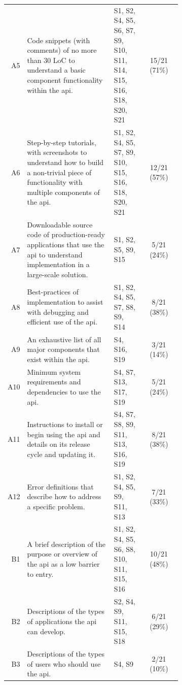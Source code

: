 \begin{small}
\begin{longtable}{rp{0.5\linewidth}|p{0.175\linewidth}|c}
  {A5}&
  {Code snippets (with comments) of no more than 30 LoC to understand a basic component functionality within the \gls{api}.}
  &
  {S1, S2, S4, S5, S6, S7, S9, S10, S11, S14, S15, S16, S18, S20, S21} &
  {15/21 (71\%)}\\

  {A6}&
  {Step-by-step tutorials, with screenshots to understand  how to build a non-trivial piece of functionality with multiple components of the \gls{api}.}
  &
  {S1, S2, S4, S5, S7, S9, S10, S15, S16, S18, S20, S21} &
  {12/21 (57\%)}\\

  A7&
  Downloadable source code of production-ready applications that use the \gls{api} to understand implementation in a large-scale solution.
  &
  S1, S2, S5, S9, S15 &
  5/21 (24\%)\\

  A8&
  Best-practices of implementation to assist with debugging and efficient use of the \gls{api}.
  &
  S1, S2, S4, S5, S7, S8, S9, S14 &
  8/21 (38\%)\\

  A9&
  An exhaustive list of all major components that exist within the \gls{api}.
  &
  S4, S16, S19 &
  3/21 (14\%)\\

  A10&
  Minimum system requirements and dependencies to use the \gls{api}.
  &
  S4, S7, S13, S17, S19 &
  5/21 (24\%)\\
  
  A11&
  Instructions to install or begin using the \gls{api} and details on its release cycle and updating it.
  &
  S4, S7, S8, S9, S11, S13, S16, S19 &
  8/21 (38\%)\\

  A12&
  Error definitions that describe how to address a specific problem.
  &
  S1, S2, S4, S5, S9, S11, S13 &
  7/21 (33\%)\\

  \midrule
  
  {B1}&
  {A brief description of the purpose or overview of the \gls{api} as a low barrier to entry.}
  &
  {S1, S2, S4, S5, S6, S8, S10, S11, S15, S16} &
  {10/21 (48\%)}\\

  B2&
  Descriptions of the types of applications the \gls{api} can develop.
  &
  S2, S4, S9, S11, S15, S18 &
  6/21 (29\%)\\

  B3&
  Descriptions of the types of users who should use the \gls{api}.
  &
  S4, S9 &
  2/21 (10\%)\\



\end{longtable}
\end{small}
